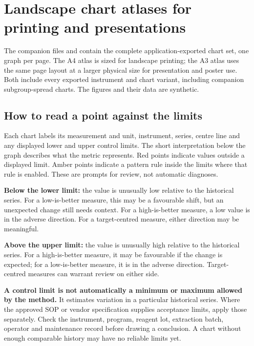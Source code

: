 \chapter{Landscape chart atlases for printing and presentations}\label{ch:atlases}

The companion files  and
 contain the complete application-exported chart set,
one graph per page. The A4 atlas is sized for landscape printing; the A3 atlas uses the same page layout at a larger
physical size for presentation and poster use. Both include every exported instrument and chart variant, including
companion subgroup-spread charts. The figures and their data are synthetic.

\section{How to read a point against the limits}
Each chart labels its measurement and unit, instrument, series, centre line and any displayed lower and upper control
limits. The short interpretation below the graph describes what the metric represents. Red points indicate values
outside a displayed limit. Amber points indicate a pattern rule inside the limits where that rule is enabled. These
are prompts for review, not automatic diagnoses.

\begin{infobox}[title={Below minimum or above maximum}]
\textbf{Below the lower limit:} the value is unusually low relative to the historical series. For a low-is-better measure,
this may be a favourable shift, but an unexpected change still needs context. For a high-is-better measure, a low value
is in the adverse direction. For a target-centred measure, either direction may be meaningful.

\textbf{Above the upper limit:} the value is unusually high relative to the historical series. For a high-is-better
measure, it may be favourable if the change is expected; for a low-is-better measure, it is in the adverse direction.
Target-centred measures can warrant review on either side.

\textbf{A control limit is not automatically a minimum or maximum allowed by the method.} It estimates variation in a
particular historical series. Where the approved SOP or vendor specification supplies acceptance limits, apply those
separately. Check the instrument, program, reagent lot, extraction batch, operator and maintenance record before drawing
a conclusion. A chart without enough comparable history may have no reliable limits yet.
\end{infobox}

